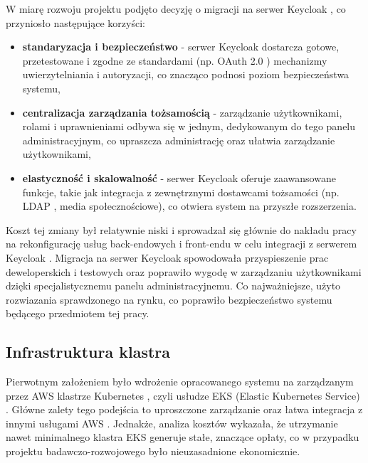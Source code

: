 W miarę rozwoju projektu podjęto decyzję o migracji na serwer Keycloak \cite{keycloak_docs}, co przyniosło następujące korzyści:
\begin{itemize}
    \item \textbf{standaryzacja i bezpieczeństwo} - serwer Keycloak \cite{keycloak_docs} dostarcza gotowe, przetestowane i zgodne ze standardami (np. OAuth 2.0 \cite{oauth2_rfc}) mechanizmy uwierzytelniania i autoryzacji, co znacząco podnosi poziom bezpieczeństwa systemu,
    \item \textbf{centralizacja zarządzania tożsamością} - zarządzanie użytkownikami, rolami i uprawnieniami odbywa się w jednym, dedykowanym do tego panelu administracyjnym, co upraszcza administrację oraz ułatwia zarządzanie użytkownikami,
    \item \textbf{elastyczność i skalowalność} - serwer Keycloak \cite{keycloak_docs} oferuje zaawansowane funkcje, takie jak integracja z zewnętrznymi dostawcami tożsamości (np. LDAP \cite{ldap_rfc}, media społecznościowe), co otwiera system na przyszłe rozszerzenia.
\end{itemize}


Koszt tej zmiany był relatywnie niski i sprowadzał się głównie do nakładu pracy na rekonfigurację usług back-endowych i front-endu w celu integracji z serwerem Keycloak \cite{keycloak_docs}. Migracja na serwer Keycloak \cite{keycloak_docs} spowodowała przyspieszenie prac deweloperskich i testowych oraz poprawiło wygodę w zarządzaniu użytkownikami dzięki specjalistycznemu panelu administracyjnemu. Co najważniejsze, użyto rozwiazania sprawdzonego na rynku, co poprawiło bezpieczeństwo systemu będącego przedmiotem tej pracy.

\subsection{Infrastruktura klastra}

Pierwotnym założeniem było wdrożenie opracowanego systemu na zarządzanym przez AWS \cite{aws_docs} klastrze Kubernetes \cite{kubernetes}, czyli usłudze EKS (Elastic Kubernetes Service) \cite{eks_docs}. Główne zalety tego podejścia to uproszczone zarządzanie oraz łatwa integracja z innymi usługami AWS \cite{aws_docs}. Jednakże, analiza kosztów wykazała, że utrzymanie nawet minimalnego klastra EKS \cite{eks_docs} generuje stałe, znaczące opłaty, co w przypadku projektu badawczo-rozwojowego było nieuzasadnione ekonomicznie.


